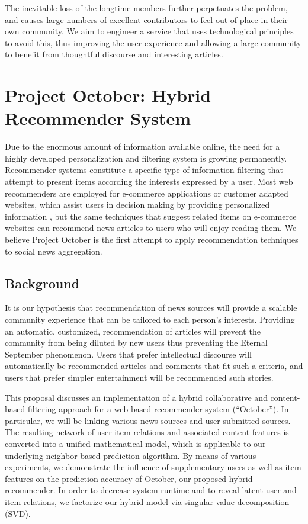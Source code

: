\documentclass[11pt,letterpaper]{article}
\begin{document}
The inevitable loss of the longtime members further perpetuates the problem, and causes large numbers of excellent contributors to feel out-of-place in their own community.
We aim to engineer a service that uses technological principles to avoid this, thus improving the user experience and allowing a large community to benefit from thoughtful discourse and interesting articles. \\

\newpage


\section{Project October: Hybrid Recommender System}

Due to the enormous amount of information available online, the need for a highly developed personalization and filtering system is growing permanently.
Recommender systems constitute a specific type of information filtering that attempt to present items according the interests expressed by a user\cite{1}.
Most web recommenders are employed for e-commerce applications or customer adapted websites, which assist users in decision making by providing personalized information \cite{5}, but the same techniques that suggest related items on e-commerce websites can recommend news articles to users who will enjoy reading them.
We believe Project October is the first attempt to apply recommendation techniques to social news aggregation.

\subsection{Background}
It is our hypothesis that recommendation of news sources will provide a scalable community experience that can be tailored to each person's interests.
Providing an automatic, customized, recommendation of articles will prevent the community from being diluted by new users thus preventing the Eternal September phenomenon.
Users that prefer intellectual discourse will automatically be recommended articles and comments that fit such a criteria, and users that prefer simpler entertainment will be recommended such stories.

This proposal discusses an implementation of a hybrid collaborative and content-based filtering approach for a web-based recommender system (``October'').
In particular, we will be linking various news sources and user submitted sources.
The resulting network of user-item relations and associated content features is converted into a unified mathematical model, which is applicable to our underlying neighbor-based prediction algorithm.
By means of various experiments, we demonstrate the influence of supplementary users as well as item features on the prediction accuracy of October, our proposed hybrid recommender. In order to decrease system runtime and to reveal latent user and item relations, we factorize our hybrid model via singular value decomposition (SVD).
\end{document}
